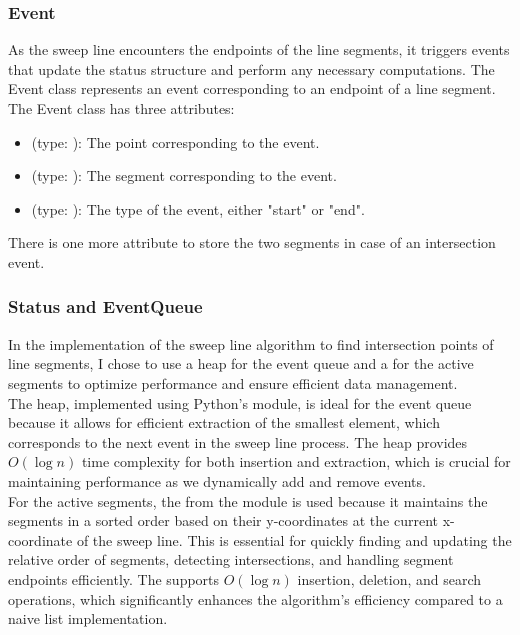 \documentclass[10pt,a4paper,hidelinks]{article}
\begin{document}
\subsubsection{Event}
As the sweep line encounters the endpoints of the line segments, it triggers events that update the status structure and perform any necessary computations. The Event class represents an event corresponding to an endpoint of a line segment. The Event class has three attributes:
\begin{itemize}
    \item {} (type: ): The point corresponding to the event.
    \item {} (type: ): The segment corresponding to the event.
    \item {} (type: ): The type of the event, either "start" or "end".
\end{itemize}
There is one more attribute to store the two segments in case of an intersection event.


\subsubsection{Status and EventQueue}
In the implementation of the sweep line algorithm to find intersection points of line segments, I chose to use a heap for the event queue and a  for the active segments to optimize performance and ensure efficient data management.\\

The heap, implemented using Python's  module, is ideal for the event queue because it allows for efficient extraction of the smallest element, which corresponds to the next event in the sweep line process. The heap provides $O(\log n)$ time complexity for both insertion and extraction, which is crucial for maintaining performance as we dynamically add and remove events.\\

For the active segments, the  from the  module is used because it maintains the segments in a sorted order based on their y-coordinates at the current x-coordinate of the sweep line. This is essential for quickly finding and updating the relative order of segments, detecting intersections, and handling segment endpoints efficiently. The  supports $O(\log n)$ insertion, deletion, and search operations, which significantly enhances the algorithm's efficiency compared to a naive list implementation.\\
\end{document}
